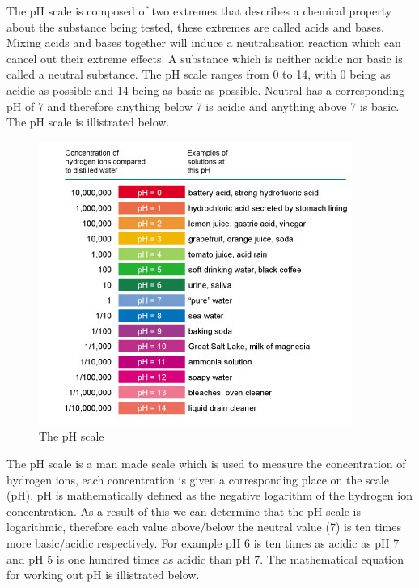 The pH scale is composed of two extremes that describes a chemical property about the substance being tested, these extremes are called acids and bases. Mixing acids and bases together will induce a neutralisation reaction which can cancel out their extreme effects. A substance which is neither acidic nor basic is called a neutral substance. The pH scale ranges from 0 to 14, with 0 being as acidic as possible and 14 being as basic as possible. Neutral has a corresponding pH of 7 and therefore anything below 7 is acidic and anything above 7 is basic. The pH scale is illistrated below.


\begin{figure}[H]
    \includegraphics[width=\textwidth]{./Planning/Images/pHScale.jpg}
    \caption{The pH scale} \label{fig:pH Scale}
\end{figure}

The pH scale is a man made scale which is used to measure the concentration of hydrogen ions, each concentration is given a corresponding place on the scale (pH). pH is mathematically defined as the negative logarithm of the hydrogen ion concentration. As a result of this we can determine that the pH scale is logarithmic, therefore each value above/below the neutral value (7) is ten times more basic/acidic respectively. For example pH 6 is ten times as acidic as pH 7  and pH 5 is one hundred times as acidic than pH 7. The mathematical equation for working out pH is illistrated below.

